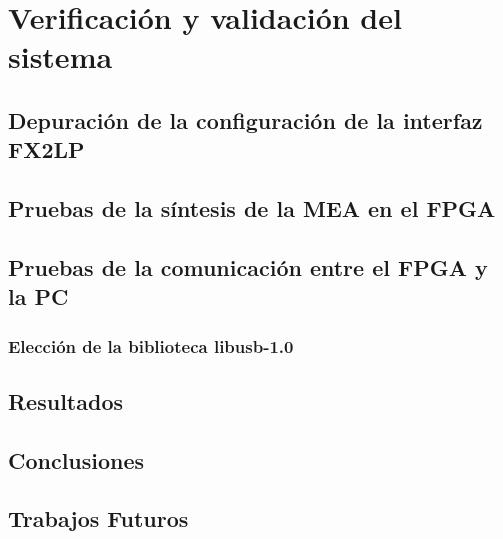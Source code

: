 \chapter{Verificación y validación del sistema}
	\label{cap:verif}
	
	\section{Depuración de la configuración de la interfaz FX2LP}
		
	\section{Pruebas de la síntesis de la MEA en el FPGA}
		
	\section{Pruebas de la comunicación entre el FPGA y la PC}
		\subsection{Elección de la biblioteca libusb-1.0}
		
		
	\section{Resultados}
		
	\section{Conclusiones}
		
	\section{Trabajos Futuros}
		